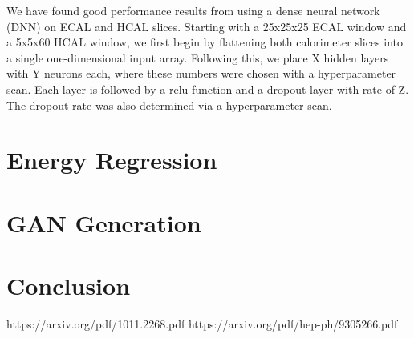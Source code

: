 \documentclass{article}
\begin{document}
    We have found good performance results from using a dense neural network (DNN) on ECAL and HCAL slices. Starting with a 25x25x25 ECAL window and a 5x5x60 HCAL window, we first begin by flattening both calorimeter slices into a single one-dimensional input array. Following this, we place X hidden layers with Y neurons each, where these numbers were chosen with a hyperparameter scan. Each layer is followed by a relu function and a dropout layer with rate of Z. The dropout rate was also determined via a hyperparameter scan.

    \section*{Energy Regression}

    \section*{GAN Generation}

    \section*{Conclusion}

    \clearpage
    \begin{thebibliography}{9}

         https://arxiv.org/pdf/1011.2268.pdf
         https://arxiv.org/pdf/hep-ph/9305266.pdf

    \end{thebibliography}
\end{document}
